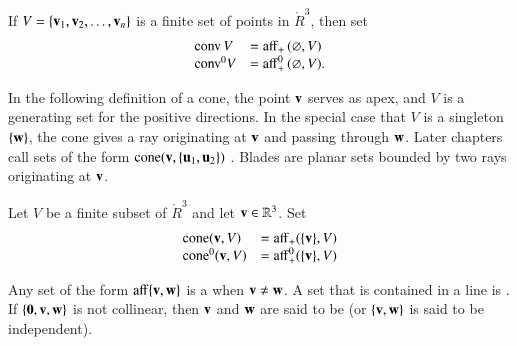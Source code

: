 \begin{definition}  If $V = \{{\mathbf v}_1,{\mathbf v}_2,\ldots,{\mathbf v}_n\}$ is a finite set
of points in $\ring{R}^3$, then
set
	$$
        \begin{array}{lll}
          {\operatorname{conv}}\, V &= {\operatorname{aff}}_+\, (\varnothing,V)\\
	   {\operatorname{conv}}^0 V &= {\operatorname{aff}}^0_+\, (\varnothing,V).\\
           \end{array}
        $$
%
%
%
\end{definition}

In the following definition of a cone, the point ${\mathbf v}$ serves
as apex, and $V$ is a generating set for the positive directions.
In the special case that $V$ is a singleton $\{{\mathbf w}\}$, 
the cone gives
a ray originating at ${\mathbf v}$ and passing through ${\mathbf w}$.  Later
chapters call sets of the form ${\operatorname{cone}}({\mathbf v},\{{\mathbf u}_1,{\mathbf u}_2\})$ .
Blades are planar sets bounded by two rays originating at ${\mathbf v}$.
%
%
%

\begin{definition}[cone]
Let $V$ be a finite subset of
$\ring{R}^3$ and let ${\mathbf v}\in\mathbb{R}^3$. Set
  $$\begin{array}{lll}
  {\operatorname{cone}}({\mathbf v},V) &= {\operatorname{aff}}_+(\{{\mathbf v}\},V)\\
  {\operatorname{cone}}^0({\mathbf v},V) &= {\operatorname{aff}}^0_+(\{{\mathbf v}\},V)\\
  \end{array}
  $$
%
%
%
\end{definition}




	
\begin{definition}	
Any set of the form ${\operatorname{aff}}\{{\mathbf v},{\mathbf w}\}$ is a  when ${\mathbf v}\ne {\mathbf w}$.  A set that is contained in a line is .  If $\{{\mathbf 0},{\mathbf v},{\mathbf w}\}$ is not collinear, then ${\mathbf v}$ and ${\mathbf w}$ are said to be  (or $\{{\mathbf v},{\mathbf w}\}$ is said to be independent).
\end{definition}
%
%

